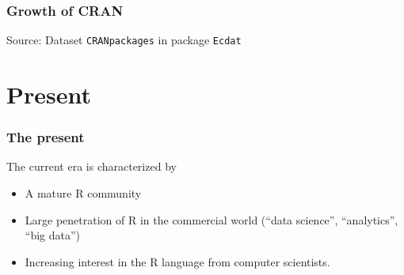 \documentclass[svgnames]{beamer}
\begin{document}
\begin{frame}
  \frametitle{Growth of CRAN}

  \begin{center}

  {\tiny Source: Dataset {\tt CRANpackages} in package {\tt Ecdat}}
  \end{center}
  
\end{frame}

\section{Present}

\begin{frame}
  \frametitle{The present}

  The current era is characterized by
  \begin{itemize}
  \item A mature R community
  \item Large penetration of R in the commercial world (``data science'',
    ``analytics'', ``big data'')
  \item Increasing interest in the R language from computer scientists.
  \end{itemize}

\end{frame}
\end{document}
